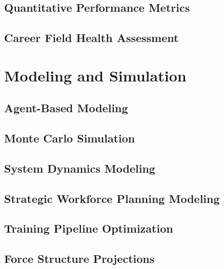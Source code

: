 \documentclass[man]{apa7}
\begin{document}
\subsection{Quantitative Performance Metrics}


\subsection{Career Field Health Assessment}


\newpage
\section{Modeling and Simulation}


\subsection{Agent-Based Modeling}


\subsection{Monte Carlo Simulation}


\subsection{System Dynamics Modeling}


\subsection{Strategic Workforce Planning Modeling}


\subsection{Training Pipeline Optimization}


\subsection{Force Structure Projections}

\end{document}
